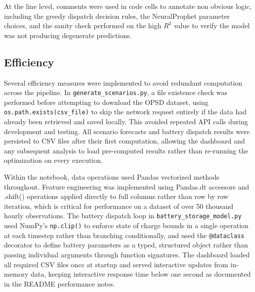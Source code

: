 \documentclass[conference]{IEEEtran}
\begin{document}
At the line level, comments were used in code cells to annotate non obvious logic, including the greedy dispatch decision rules, the NeuralProphet parameter choices, and the sanity check performed on the high \(R^2\) value to verify the model was not producing degenerate predictions.
 
\subsection{Efficiency}
 
Several efficiency measures were implemented to avoid redundant computation across the pipeline. In \texttt{generate\_scenarios.py}, a file existence check was performed before attempting to download the OPSD dataset, using \texttt{os.path.exists(csv\_file)} to skip the network request entirely if the data had already been retrieved and saved locally. This avoided repeated API calls during development and testing. All scenario forecasts and battery dispatch results were persisted to CSV files after their first computation, allowing the dashboard and any subsequent analysis to load pre-computed results rather than re-running the optimization on every execution.
 
Within the notebook, data operations used Pandas vectorized methods throughout. Feature engineering was implemented using Pandas.dt accessors and .shift() operations applied directly to full columns rather than row by row iteration, which is critical for performance on a dataset of over 50 thousand hourly observations. The battery dispatch loop in \texttt{battery\_storage\_model.py} used NumPy's \texttt{np.clip()} to enforce state of charge bounds in a single operation at each timestep rather than branching conditionally, and used the \texttt{@dataclass} decorator to define battery parameters as a typed, structured object rather than passing individual arguments through function signatures. The dashboard loaded all required CSV files once at startup and served interactive updates from in-memory data, keeping interactive response time below one second as documented in the README performance notes.
\end{document}
